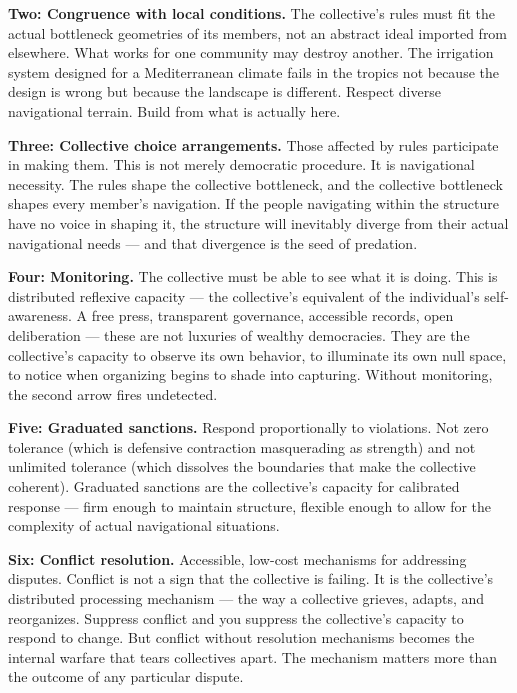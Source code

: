 \textbf{Two: Congruence with local conditions.} The collective's rules must fit the actual bottleneck geometries of its members, not an abstract ideal imported from elsewhere. What works for one community may destroy another. The irrigation system designed for a Mediterranean climate fails in the tropics not because the design is wrong but because the landscape is different. Respect diverse navigational terrain. Build from what is actually here.


\textbf{Three: Collective choice arrangements.} Those affected by rules participate in making them. This is not merely democratic procedure. It is navigational necessity. The rules shape the collective bottleneck, and the collective bottleneck shapes every member's navigation. If the people navigating within the structure have no voice in shaping it, the structure will inevitably diverge from their actual navigational needs — and that divergence is the seed of predation.


\textbf{Four: Monitoring.} The collective must be able to see what it is doing. This is distributed reflexive capacity — the collective's equivalent of the individual's self-awareness. A free press, transparent governance, accessible records, open deliberation — these are not luxuries of wealthy democracies. They are the collective's capacity to observe its own behavior, to illuminate its own null space, to notice when organizing begins to shade into capturing. Without monitoring, the second arrow fires undetected.


\textbf{Five: Graduated sanctions.} Respond proportionally to violations. Not zero tolerance (which is defensive contraction masquerading as strength) and not unlimited tolerance (which dissolves the boundaries that make the collective coherent). Graduated sanctions are the collective's capacity for calibrated response — firm enough to maintain structure, flexible enough to allow for the complexity of actual navigational situations.


\textbf{Six: Conflict resolution.} Accessible, low-cost mechanisms for addressing disputes. Conflict is not a sign that the collective is failing. It is the collective's distributed processing mechanism — the way a collective grieves, adapts, and reorganizes. Suppress conflict and you suppress the collective's capacity to respond to change. But conflict without resolution mechanisms becomes the internal warfare that tears collectives apart. The mechanism matters more than the outcome of any particular dispute.


